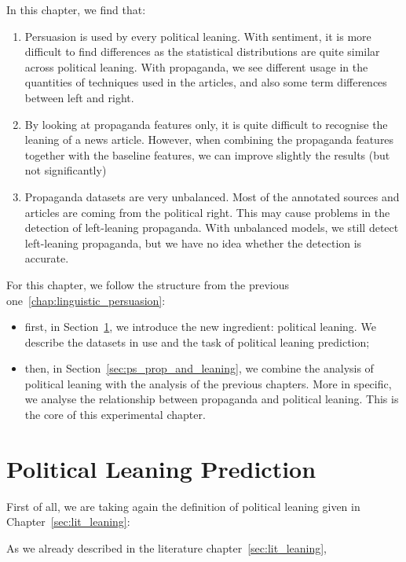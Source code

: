 In this chapter, we find that:
\begin{enumerate}
    \item Persuasion is used by every political leaning. With sentiment, it is more difficult to find differences as the statistical distributions are quite similar across political leaning. With propaganda, we see different usage in the quantities of techniques used in the articles, and also some term differences between left and right.
    \item By looking at propaganda features only, it is quite difficult to recognise the leaning of a news article. However, when combining the propaganda features together with the baseline features, we can improve slightly the results (but not significantly)
    \item Propaganda datasets are very unbalanced. Most of the annotated sources and articles are coming from the political right. This may cause problems in the detection of left-leaning propaganda. With unbalanced models, we still detect left-leaning propaganda, but we have no idea whether the detection is accurate.
\end{enumerate}

For this chapter, we follow the structure from the previous one~\ref{chap:linguistic_persuasion}:
\begin{itemize}
    \item first, in Section~\ref{sec:ps_political_sides}, we introduce the new ingredient: political leaning. We describe the datasets in use and the task of political leaning prediction;
    \item then, in Section~\ref{sec:ps_prop_and_leaning}, we combine the analysis of political leaning with the analysis of the previous chapters. More in specific, we analyse the relationship between propaganda and political leaning. This is the core of this experimental chapter.
\end{itemize}


\section{\statusred Political Leaning Prediction}
\label{sec:ps_political_sides}

First of all, we are taking again the definition of political leaning given in Chapter~\ref{sec:lit_leaning}: 

As we already described in the literature chapter~\ref{sec:lit_leaning}, 

